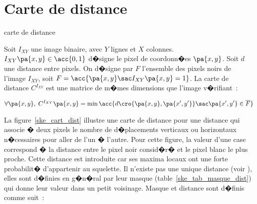 \section{Carte de distance}

\label{ske_carte_distance_sec}

        \begin{xdefinition}{carte de distance}
        \label{ske_def_cart_dist_def}
        
        Soit $I_{XY}$ une image binaire, avec $Y$ lignes et $X$ colonnes. $I_{XY}\pa{x,y} \in \acc{0,1}$ 
        d�signe le pixel de coordonn�es $\pa{x,y}$. Soit $d$ une distance entre pixels. On d�signe par 
        $F$ l'ensemble des pixels noirs de l'image $I_{XY}$, soit $F = \acc{ \pa{x,y} \sac I_{XY}\pa{x,y} = 1}$.
        La carte de distance $C^{I_{XY}}$ est
        une matrice de m�mes dimensions que l'image v�rifiant~:
        
                \begin{eqnarray}
                \forall \pa{x,y}, \; C^{I_{XY}}\pa{x,y} = \min \acc{ d\cro{ \pa{x,y}, \pa{x',y'}} 
                                                                                                                            \sac \pa{x',y'} \in \overline{F} } 
                \label{ske_eq_carte_dist}                                                                                                                    
                \end{eqnarray}
        
        \end{xdefinition}


La figure~\ref{ske_cart_dist} illustre une carte de distance pour une distance qui associe � deux pixels le nombre de d�placements verticaux ou horizontaux n�cessaires pour aller de l'un � l'autre. Pour cette figure, la valeur d'une case correspond � la distance entre le pixel noir consid�r� et le pixel blanc le plus proche. Cette distance est introduite car ses maxima locaux ont une forte probabilit� d'appartenir au squelette. Il n'existe pas une unique distance (voir ), elles sont d�finies en g�n�ral par leur masque (table~\ref{ske_tab_masque_dist}) qui donne leur valeur dans un petit voisinage. Masque et distance sont d�finis comme suit~:


